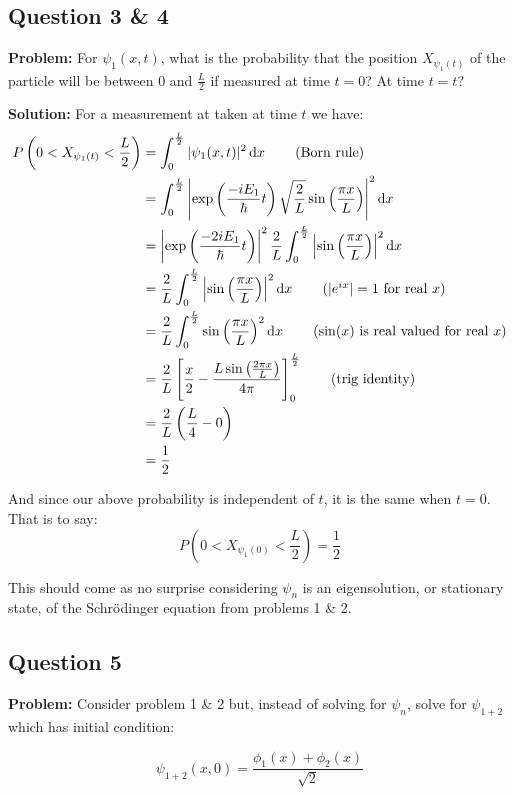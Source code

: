 \documentclass{article}
\renewcommand{\eval}[3]{\left[#1\right]_{#2}^{#3}}
\begin{document}
\subsection*{Question 3 \& 4}
\noindent\textbf{Problem:} For $\psi_1(x,t)$, what is the probability that the position $X_{\psi_1(t)}$ of the particle will be between $0$ and $\frac{L}{2}$ if measured at time $t=0$? At time $t=t$?
\bigskip

\noindent\textbf{Solution:} For a measurement at taken at time $t$ we have:
\begin{align*}
    P\left(0<X_{\psi_1(t)}<\frac{L}{2}\right)&=\int_0^{\frac{L}{2}}|\psi_1(x,t)|^2\dd{x}\tag{Born rule}\\
    &=\int_0^{\frac{L}{2}}\left|\exp\left(\frac{-iE_1}{\hbar}t\right)\sqrt{\frac{2}{L}}\sin\left(\frac{\pi x}{L}\right)\right|^2\dd{x}\\
    &=\left|\exp\left(\frac{-2iE_1}{\hbar}t\right)\right|^2\frac{2}{L}\int_0^{\frac{L}{2}}\left|\sin\left(\frac{\pi x}{L}\right)\right|^2\dd{x}\\
    &=\frac{2}{L}\int_0^{\frac{L}{2}}\left|\sin\left(\frac{\pi x}{L}\right)\right|^2\dd{x}\tag{$|e^{ix}|=1$ for real $x$}\\
    &=\frac{2}{L}\int_0^{\frac{L}{2}}\sin\left(\frac{\pi x}{L}\right)^2\dd{x}\tag{$\sin(x)$ is real valued for real $x$}\\
    &=\frac{2}{L}\eval{\frac{x}{2}-\frac{L\sin\left(\frac{2\pi x}{L}\right)}{4\pi}}{0}{\frac{L}{2}}\tag{trig identity}\\
    &=\frac{2}{L}\left(\frac{L}{4}-0\right)\\
    &=\frac{1}{2}
\end{align*}

And since our above probability is independent of $t$, it is the same when $t=0$. That is to say:
$$P\left(0<X_{\psi_1(0)}<\frac{L}{2}\right)=\frac{1}{2}$$

This should come as no surprise considering $\psi_n$ is an eigensolution, or stationary state, of the Schrödinger equation from problems 1 \& 2.

\subsection*{Question 5}
\noindent\textbf{Problem:} Consider problem 1 \& 2 but, instead of solving for $\psi_n$, solve for $\psi_{1+2}$ which has initial condition:

$$\psi_{1+2}(x,0)=\frac{\phi_1(x)+\phi_2(x)}{\sqrt{2}}$$
\end{document}
